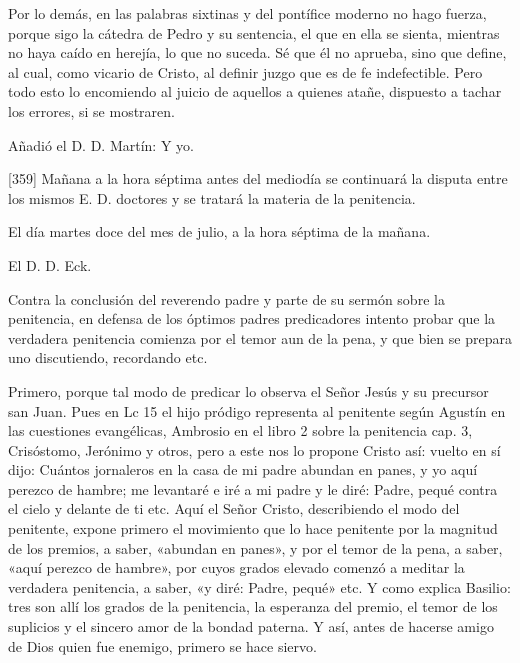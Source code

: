 Por lo demás, en las palabras sixtinas y del pontífice moderno no hago fuerza, porque sigo la cátedra de Pedro y su sentencia, el que en ella se sienta, mientras no haya caído en herejía, lo que no suceda. Sé que él no aprueba, sino que define, al cual, como vicario de Cristo, al definir juzgo que es de fe indefectible. Pero todo esto lo encomiendo al juicio de aquellos a quienes atañe, dispuesto a tachar los errores, si se mostraren.

Añadió el D. D. Martín: Y yo.

[359] Mañana a la hora séptima antes del mediodía se continuará la disputa entre los mismos E. D. doctores y se tratará la materia de la penitencia.

El día martes doce del mes de julio, a la hora séptima de la mañana.

El D. D. Eck.

Contra la conclusión del reverendo padre y parte de su sermón sobre la penitencia, en defensa de los óptimos padres predicadores intento probar que la verdadera penitencia comienza por el temor aun de la pena, y que bien se prepara uno discutiendo, recordando etc.

Primero, porque tal modo de predicar lo observa el Señor Jesús y su precursor san Juan. Pues en Lc 15 el hijo pródigo representa al penitente según Agustín en las cuestiones evangélicas, Ambrosio en el libro 2 sobre la penitencia cap. 3, Crisóstomo, Jerónimo y otros, pero a este nos lo propone Cristo así: vuelto en sí dijo: Cuántos jornaleros en la casa de mi padre abundan en panes, y yo aquí perezco de hambre; me levantaré e iré a mi padre y le diré: Padre, pequé contra el cielo y delante de ti etc. Aquí el Señor Cristo, describiendo el modo del penitente, expone primero el movimiento que lo hace penitente por la magnitud de los premios, a saber, «abundan en panes», y por el temor de la pena, a saber, «aquí perezco de hambre», por cuyos grados elevado comenzó a meditar la verdadera penitencia, a saber, «y diré: Padre, pequé» etc. Y como explica Basilio: tres son allí los grados de la penitencia, la esperanza del premio, el temor de los suplicios y el sincero amor de la bondad paterna. Y así, antes de hacerse amigo de Dios quien fue enemigo, primero se hace siervo.

